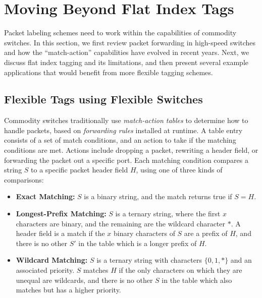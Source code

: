 \section{Moving Beyond Flat Index Tags}
\label{sec:background}


Packet labeling schemes need to work within the capabilities of commodity switches.  In this section, we first review packet forwarding in high-speed switches and how the ``match-action'' capabilities have evolved in recent years.  Next, we discuss flat index tagging and its limitations, and then present several example applications that would benefit from more flexible tagging schemes.

\subsection{Flexible Tags using Flexible Switches}
Commodity switches traditionally use \emph{match-action tables} to determine how to handle packets, based on \textit{forwarding rules} installed at runtime. A table entry consists of a set of match conditions, and an action to take if the matching conditions are met. Actions include dropping a packet, rewriting a header field, or forwarding the packet out a specific port. 
Each matching condition compares a string $S$ to a specific packet header field $H$, using one of three kinds of comparisons:

\begin{itemize}
  \item \textbf{Exact Matching:} $S$ is a binary string, and the match returns true if $S = H$.
  \item \textbf{Longest-Prefix Matching:} $S$ is a ternary string, where the first $x$ characters are binary, and the remaining are the wildcard character $*$. A header field is a match if the $x$ binary characters of $S$ are a prefix of $H$, and there is no other $S'$ in the table which is a longer prefix of $H$. 
  \item \textbf{Wildcard Matching:} $S$ is a ternary string with characters $\{0,1,*\}$ and an associated priority. $S$ matches $H$ if the only characters on which they are unequal are wildcards, and there is no other $S$ in the table which also matches but has a higher priority.
\end{itemize}
  
